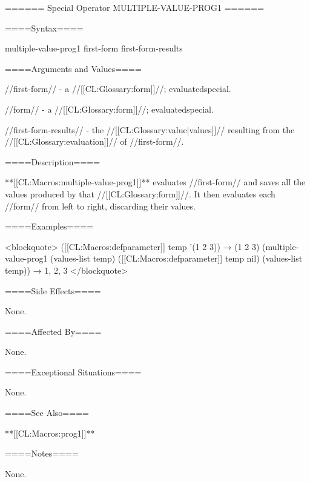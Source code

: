 ====== Special Operator MULTIPLE-VALUE-PROG1 ======

====Syntax====

\DefspecWithValues multiple-value-prog1 {first-form } {first-form-results}

====Arguments and Values====

//first-form// - a //[[CL:Glossary:form]]//; evaluatedspecial.

//form// - a //[[CL:Glossary:form]]//; evaluatedspecial.

//first-form-results// - the //[[CL:Glossary:value|values]]// resulting from the //[[CL:Glossary:evaluation]]// of //first-form//.

====Description====

**[[CL:Macros:multiple-value-prog1]]** evaluates //first-form// and saves all the values produced by that //[[CL:Glossary:form]]//. It then evaluates each //form// from left to right, discarding their values.

====Examples====

<blockquote> ([[CL:Macros:defparameter]] temp '(1 2 3)) → (1 2 3) (multiple-value-prog1 (values-list temp) ([[CL:Macros:defparameter]] temp nil) (values-list temp)) → 1, 2, 3 </blockquote>

====Side Effects====

None.

====Affected By====

None.

====Exceptional Situations====

None.

====See Also====

**[[CL:Macros:prog1]]**

====Notes====

None.

